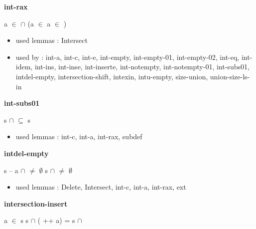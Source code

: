 \documentclass[a4paper]{article}
\begin{document}
\medskip

\bigskip

{\large\bf int-rax}

\medskip

 \Fol a $\in$  $\cap$  \Equiv \Not \Not (a $\in$  \And a $\in$ )

\begin{itemize}


\item       used lemmas  : Intersect
\item       used by      : int-a, int-c, int-e, int-empty, int-empty-01, int-empty-02, int-eq, int-idem, int-ins, int-inse, int-inserte, int-notempty, int-notempty-01, int-subs01, intdel-empty, intersection-shift, intexin, intu-empty, size-union, union-size-ls-in

\end{itemize}

\medskip

\bigskip

{\large\bf int-subs01}

\medskip

 \Fol s $\cap$  $\subseteq$ s

\begin{itemize}


\item       used lemmas  : int-c, int-a, int-rax, subdef

\end{itemize}

\medskip

\bigskip

{\large\bf intdel-empty}

\medskip

 \Fol s -- a $\cap$  $\neq$ $\emptyset$ \Imp s $\cap$  $\neq$ $\emptyset$

\begin{itemize}


\item       used lemmas  : Delete, Intersect, int-c, int-a, int-rax, ext

\end{itemize}

\medskip

\bigskip

{\large\bf intersection-insert}

\medskip

 \Fol \Not a $\in$ s \Imp s $\cap$ ( ++ a) = s $\cap$ 
\end{document}
